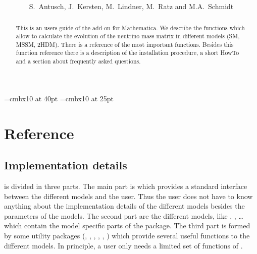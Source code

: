 \documentclass[10pt,a4paper,twoside]{scrartcl}
\begin{document}
\font\TitleFont=cmbx10 at 40pt \font\SubTitleFont=cmbx10 at 25pt
 \title{\\[1cm] } \author{S.~Antusch, J.~Kersten,
M.~Lindner, M.~Ratz and M.A.~Schmidt} \maketitle
\begin{abstract}
  This is an users guide of the  add-on
  for Mathematica. We describe the functions which allow to calculate the
  evolution of the neutrino mass matrix in different models (SM, MSSM, 2HDM).
  There is a reference of the most important functions. Besides this function
  reference there is a description of the installation procedure, a short HowTo and a section about frequently asked questions.
\end{abstract}
\thispagestyle{empty}
\tableofcontents
\clearpage




%






\section{Reference}

\subsection{Implementation details}

 is divided in three parts. The main part
is  which
provides a standard interface between the different models and the user. Thus
the user does not have to know anything about the implementation details of the
different models besides the parameters of the models. 
The second part are the different models, like ,
, \dots which contain the model
specific parts of the package. 
The third part is formed by some utility packages
(, , 
, , , ) which provide several useful functions
to the different models. In principle, a user only needs a limited set of
functions of .
\end{document}
